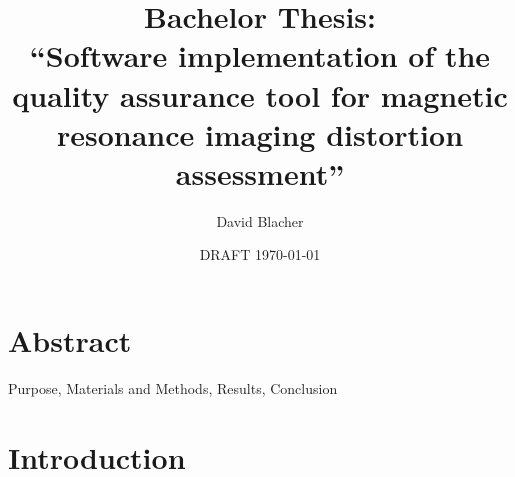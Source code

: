 \documentclass[parskip,bibtotoc,final,twoside=false,titlepage,a4paper,english,12pt,titlepage,a4paper]{scrbook}
\title{Bachelor Thesis:\\
“Software implementation of the quality assurance tool for magnetic resonance imaging distortion assessment”}
\author{David Blacher}
\date{DRAFT \today }
\begin{document}
\maketitle
\tableofcontents
\cleardoublepage





\chapter*{Abstract}
Purpose, Materials and Methods, Results, Conclusion



\chapter{Introduction}
\end{document}
